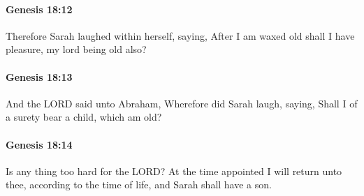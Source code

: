 		\paragraph{Genesis 18:12} %
			\label{GENESIS-18-12}

			Therefore Sarah laughed within herself, saying, After I am waxed old shall I have pleasure, my lord being old also?


		\paragraph{Genesis 18:13} %
			\label{GENESIS-18-13}

			And the LORD said unto Abraham, Wherefore did Sarah laugh, saying, Shall I of a surety bear a child, which am old?


		\paragraph{Genesis 18:14} %
			\label{GENESIS-18-14}

			Is any thing too hard for the LORD?  At the time appointed I will return unto thee, according to the time of life, and Sarah shall have a son.



